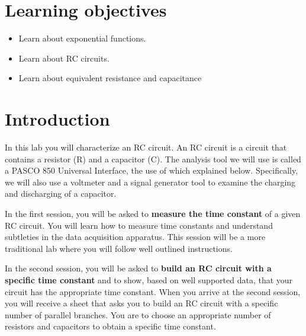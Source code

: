 \documentclass[12pt]{report}
\begin{document}
\section{Learning objectives}
\begin{itemize}
\item Learn about exponential functions.
\item Learn about RC circuits.
\item Learn about equivalent resistance and capacitance
\end{itemize}

\section{Introduction}
In this lab you will characterize an RC circuit. An RC circuit is a circuit that contains a resistor (R) and a capacitor (C). The analysis tool we will use is called a PASCO 850 Universal Interface, the use of which explained below. Specifically, we will also use a voltmeter and a
signal generator tool to examine the charging and discharging of a capacitor. 

In the first session, you will be asked to \textbf{measure the time constant} of a given RC circuit. You will learn how to measure time constants and understand subtleties in the data acquisition apparatus. This session will be a more traditional lab where you will follow well outlined instructions. 

In the second session, you will be asked to \textbf{build an RC circuit with a specific time constant} and to show, based on well supported data, that your circuit has the appropriate time constant. When you arrive at the second session, you will receive a sheet that asks you to build an RC circuit with a specific number of parallel branches. You are to choose an appropriate number of resistors and capacitors to obtain a specific time constant.
\end{document}
